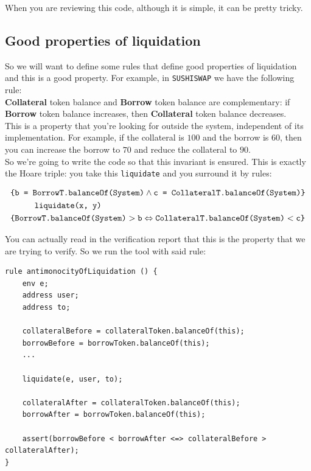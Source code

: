 \documentclass[oneside]{book}
\begin{document}
    When you are reviewing this code, although it is simple, it can be pretty tricky.
    
    \subsection{Good properties of liquidation}
    
    So we will want to define some rules that define good properties of liquidation and this is a good property.
    For example, in \texttt{SUSHISWAP} we have the following rule:\\


    \textbf{Collateral} token balance and \textbf{Borrow} token balance are complementary: if \textbf{Borrow} token balance increases, then \textbf{Collateral} token balance decreases.\\

    This is a property that you're looking for outside the system, independent of its implementation.
    For example, if the collateral is $100$ and the borrow is $60$, then you can increase the borrow to $70$ and reduce the collateral to $90$.\\

    So we're going to write the code so that this invariant is ensured.
    This is exactly the Hoare triple: you take this \texttt{liquidate} and you surround it by rules:

    \begin{align*}
        &\text{\texttt{\{b = BorrowT.balanceOf(System)}}\wedge\text{\texttt{c = CollateralT.balanceOf(System)\}}}\\
        &\hspace{1cm}\text{\texttt{liquidate(x, y)}}\\
        &\text{\texttt{\{BorrowT.balanceOf(System)}}>\text{\texttt{b}}\Leftrightarrow\text{\texttt{CollateralT.balanceOf(System)}}<\text{\texttt{c\}}}\\
    \end{align*}

    You can actually read in the verification report that this is the property that we are trying to verify.
    So we run the tool with said rule:

    \begin{lstlisting}[language=Solidity, style=SolStyle]
rule antimonocityOfLiquidation () {
    env e;
    address user;
    address to;

    collateralBefore = collateralToken.balanceOf(this);
    borrowBefore = borrowToken.balanceOf(this);
    ...

    liquidate(e, user, to);

    collateralAfter = collateralToken.balanceOf(this);
    borrowAfter = borrowToken.balanceOf(this);

    assert(borrowBefore < borrowAfter <=> collateralBefore > collateralAfter);
}
\end{lstlisting}
\end{document}
